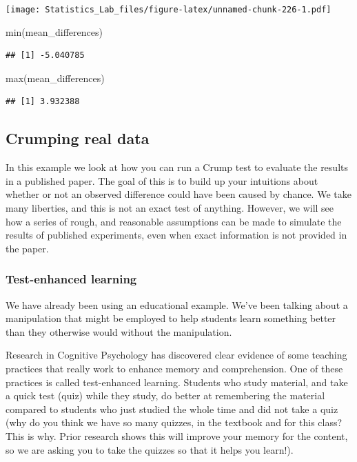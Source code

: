 \documentclass[
]{book}
\newenvironment{Shaded}{\begin{snugshade}}{\end{snugshade}}
\newcommand{\FunctionTok}[1]{\textcolor[rgb]{0.00,0.00,0.00}{#1}}
\newcommand{\NormalTok}[1]{#1}
\begin{document}
\texttt{[image: Statistics\_Lab\_files/figure-latex/unnamed-chunk-226-1.pdf]}

\begin{Shaded}
\begin{Highlighting}[]
\FunctionTok{min}\NormalTok{(mean\_differences)}
\end{Highlighting}
\end{Shaded}

\begin{verbatim}
## [1] -5.040785
\end{verbatim}

\begin{Shaded}
\begin{Highlighting}[]
\FunctionTok{max}\NormalTok{(mean\_differences)}
\end{Highlighting}
\end{Shaded}

\begin{verbatim}
## [1] 3.932388
\end{verbatim}

\hypertarget{crumping-real-data}{%
\subsection{Crumping real data}\label{crumping-real-data}}

In this example we look at how you can run a Crump test to evaluate the results in a published paper. The goal of this is to build up your intuitions about whether or not an observed difference could have been caused by chance. We take many liberties, and this is not an exact test of anything. However, we will see how a series of rough, and reasonable assumptions can be made to simulate the results of published experiments, even when exact information is not provided in the paper.

\hypertarget{test-enhanced-learning}{%
\subsubsection{Test-enhanced learning}\label{test-enhanced-learning}}

We have already been using an educational example. We've been talking about a manipulation that might be employed to help students learn something better than they otherwise would without the manipulation.

Research in Cognitive Psychology has discovered clear evidence of some teaching practices that really work to enhance memory and comprehension. One of these practices is called test-enhanced learning. Students who study material, and take a quick test (quiz) while they study, do better at remembering the material compared to students who just studied the whole time and did not take a quiz (why do you think we have so many quizzes, in the textbook and for this class? This is why. Prior research shows this will improve your memory for the content, so we are asking you to take the quizzes so that it helps you learn!).
\end{document}
